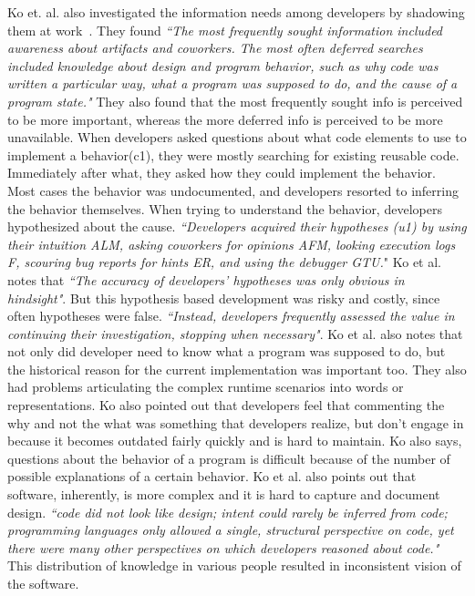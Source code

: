 Ko et. al. also investigated the information needs among developers by shadowing them at work~\cite{Ko:2007}. They found \textit{``The most frequently sought information included awareness about artifacts and coworkers. The most often deferred searches included knowledge about design and program behavior, such as why code was written a particular way, what a program was supposed to do, and the cause of a program state."} They also found that the most frequently sought info is perceived to be more important, whereas the more deferred info is perceived to be more unavailable.
When developers asked questions about what code elements to use to implement a behavior(c1), they were mostly searching for existing reusable code. Immediately after what, they asked how they could implement the behavior. Most cases the behavior was undocumented, and developers resorted to inferring the behavior themselves. 
When trying to understand the behavior, developers hypothesized about the cause. \textit{``Developers acquired their hypotheses (u1) by using their intuition {ALM}, asking coworkers for opinions {AFM}, looking execution logs {F}, scouring bug reports for hints {ER}, and using the debugger {GTU}.}" Ko et al. notes that \textit{``The accuracy of developers' hypotheses was only obvious in hindsight"}. But this hypothesis based development was risky and costly, since often hypotheses were false. \textit{``Instead, developers frequently assessed the value in continuing their investigation, stopping when necessary"}. Ko et al. also notes that not only did developer need to know what a program was supposed to do, but the historical reason for the current implementation was important too. They also had problems articulating the complex runtime scenarios into words or representations. Ko also pointed out that developers feel that commenting the why and not the what was something that developers realize, but don't engage in because it becomes outdated fairly quickly and is hard to maintain. Ko also says, questions about the behavior of a program is difficult because of the number of possible explanations of a certain behavior.
Ko et al. also points out that software, inherently, is more complex and it is hard to capture and document design. \textit{``code did not look like design; intent could rarely be inferred from code; programming languages only allowed a single, structural perspective on code, yet there were many other perspectives on which developers reasoned about code."} This distribution of knowledge in various people resulted in inconsistent vision of the software.

